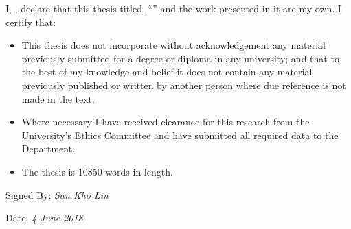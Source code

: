 \documentclass[
11pt, %
oneside, %
english, %
singlespacing, %
headsepline, %
chapterinoneline, %
consistentlayout, %
]{MastersDoctoralThesis} %
\begin{document}

\begin{declaration}
\addchaptertocentry{\authorshipname} %
\bigskip\noindent\ignorespaces

\noindent I, \authorname, declare that this thesis titled, \enquote{\ttitle} and the work presented in it are my own. I certify that:

\begin{itemize} 
\item This thesis does not incorporate without acknowledgement any material previously submitted for a degree or diploma in any university; and that to the best of my knowledge and belief it does not contain any material previously published or written by another person where due reference is not made in the text.
\item Where necessary I have received clearance for this research from the University's Ethics Committee and have submitted all required data to the Department.
\item The thesis is 10850 words in length.\\ %
\end{itemize}
 
\noindent Signed By:  \textit{San Kho Lin}
 
\noindent Date: \textit{4 June 2018}
\end{declaration}

\cleardoublepage




\end{document}
